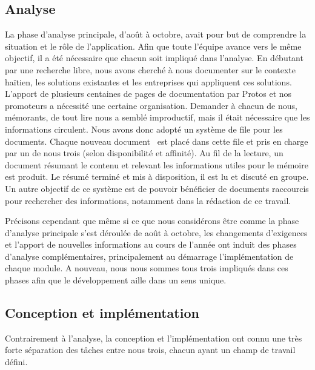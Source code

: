 \documentclass{EPL-master-thesis-covers-FR}
\begin{document}
			\subsection*{Analyse}

				La phase d'analyse principale, d'août à octobre, avait pour but de comprendre la situation et le rôle de l'application. Afin que toute l'équipe avance vers le même objectif, il a été nécessaire que chacun soit impliqué dans l'analyse. En débutant par une recherche libre, nous avons cherché à nous documenter sur le contexte haïtien, les solutions existantes et les entreprises qui appliquent ces solutions. L'apport de plusieurs centaines de pages de documentation par Protos et nos promoteurs a nécessité une certaine organisation. Demander à chacun de nous, mémorants, de tout lire nous a semblé improductif, mais il était nécessaire que les informations circulent. Nous avons donc adopté un système de file pour les documents. Chaque nouveau document~\cite{ref:resumes_documents} est placé dans cette file et pris en charge par un de nous trois (selon disponibilité et affinité). Au fil de la lecture, un document résumant le contenu et relevant les informations utiles pour le mémoire est produit. Le résumé terminé et mis à disposition, il est lu et discuté en groupe. Un autre objectif de ce système est de pouvoir bénéficier de documents raccourcis pour rechercher des informations, notamment dans la rédaction de ce travail.

				Précisons cependant que même si ce que nous considérons être comme la phase d'analyse principale s'est déroulée de août à octobre, les changements d'exigences et l'apport de nouvelles informations au cours de l'année ont induit des phases d'analyse complémentaires, principalement au démarrage l'implémentation de chaque module. A nouveau, nous nous sommes tous trois impliqués dans ces phases afin que le développement aille dans un sens unique.

			\subsection*{Conception et implémentation}

				Contrairement à l'analyse, la conception et l'implémentation ont connu une très forte séparation des tâches entre nous trois, chacun ayant un champ de travail défini.
\end{document}
